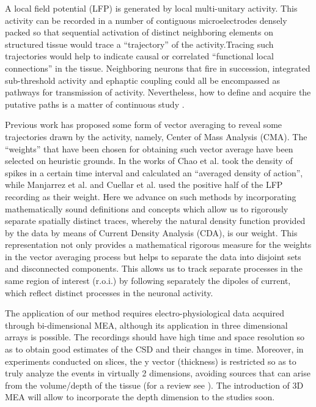 \documentclass[letterpaper,12pts]{article}
\begin{document}
A local field potential (LFP) is generated by local multi-unitary activity. This activity can be recorded in a number of contiguous microelectrodes densely packed so that sequential activation of distinct neighboring elements on structured tissue would trace a ``trajectory'' of the activity.Tracing such trajectories would help to indicate causal or correlated ``functional local connections'' in the tissue. Neighboring neurons that fire in succession, integrated sub-threshold activity and ephaptic coupling could all be encompassed as pathways for transmission of activity. Nevertheless, how to define and acquire the putative paths is a matter of continuous study \cite{Herreras2016}.


Previous work has proposed some form of vector averaging to reveal some trajectories drawn by the activity, namely, Center of Mass Analysis (CMA). The ``weights'' that have been chosen for obtaining such vector average have been selected on heuristic grounds. In the works of Chao et al. \cite{Chao05, Chao07} took the density of spikes in a certain time interval and calculated an “averaged density of action”, while Manjarrez et al. \cite{Manjarrez07} and Cuellar et al. \cite{Cuellar2009} used the positive half of the LFP recording as their weight. Here we advance on such methods by incorporating mathematically sound definitions and concepts which allow us to rigorously separate spatially distinct traces, whereby the natural density function provided by the data by means of Current Density Analysis (CDA), is our weight. This representation not only provides a mathematical rigorous measure for the weights in the vector averaging process but helps to separate the data into disjoint sets and disconnected components. This allows us to track separate processes in the same region of interest (r.o.i.) by following separately the dipoles of current, which reflect distinct processes in the neuronal activity.

The application of our method requires electro-physiological data acquired through bi-dimensional MEA, although its application in three dimensional arrays is possible. The recordings should have high time and space resolution so as to obtain good estimates of the CSD and their changes in time. Moreover, in experiments conducted on slices, the y vector (thickness) is restricted so as to truly analyze the events in virtually 2 dimensions, avoiding sources that can arise from the volume/depth of the tissue (for a review see \cite{Herreras2016}). The introduction of 3D MEA will allow to incorporate the depth dimension to the studies soon. 
\end{document}

